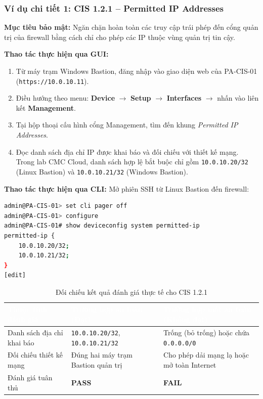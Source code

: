 \documentclass[12pt,a4paper]{article}
\renewcommand{\arraystretch}{1.3}
\begin{document}
\subsubsection{Ví dụ chi tiết 1: CIS 1.2.1 -- Permitted IP Addresses}
\noindent\textbf{Mục tiêu bảo mật:} Ngăn chặn hoàn toàn các truy cập trái phép đến cổng quản trị của firewall bằng cách chỉ cho phép các IP thuộc vùng quản trị tin cậy.

\noindent\textbf{Thao tác thực hiện qua GUI:}
\begin{enumerate}
    \item Từ máy trạm Windows Bastion, đăng nhập vào giao diện web của PA-CIS-01 (\texttt{https://10.0.10.11}).
    \item Điều hướng theo menu: \textbf{Device} $\rightarrow$ \textbf{Setup} $\rightarrow$ \textbf{Interfaces} $\rightarrow$ nhấn vào liên kết \textbf{Management}.
    \item Tại hộp thoại cấu hình cổng Management, tìm đến khung \textit{Permitted IP Addresses}.
    \item Đọc danh sách địa chỉ IP được khai báo và đối chiếu với thiết kế mạng. Trong lab CMC Cloud, danh sách hợp lệ bắt buộc chỉ gồm \texttt{10.0.10.20/32} (Linux Bastion) và \texttt{10.0.10.21/32} (Windows Bastion).
\end{enumerate}

\noindent\textbf{Thao tác thực hiện qua CLI:}
Mở phiên SSH từ Linux Bastion đến firewall:
\begin{lstlisting}[language=bash,caption={Truy vấn Permitted IP Addresses qua CLI}]
admin@PA-CIS-01> set cli pager off
admin@PA-CIS-01> configure
admin@PA-CIS-01# show deviceconfig system permitted-ip
permitted-ip {
    10.0.10.20/32;
    10.0.10.21/32;
}
[edit]
\end{lstlisting}

\begin{table}[H]
\centering\small
\caption{Đối chiếu kết quả đánh giá thực tế cho CIS 1.2.1}
\label{tab:cis-121-eval}
\renewcommand{\arraystretch}{1.45}
\begingroup
\setlength{\tabcolsep}{5pt}
\begin{tabular}{|>{\raggedright\arraybackslash}p{4.0cm}|>{\raggedright\arraybackslash}p{5.1cm}|>{\raggedright\arraybackslash}p{5.1cm}|}
\hline
\rowcolor{CISBlue}
\textcolor{white}{\textbf{Thuộc tính đánh giá}} & \textcolor{white}{\textbf{Trường hợp an toàn (Đạt)}} & \textcolor{white}{\textbf{Trường hợp mất an toàn (Không đạt)}} \\
\hline
Danh sách địa chỉ khai báo & \texttt{10.0.10.20/32}, \texttt{10.0.10.21/32} & Trống (bỏ trống) hoặc chứa \texttt{0.0.0.0/0} \\ \hline
Đối chiếu thiết kế mạng & Đúng hai máy trạm Bastion quản trị & Cho phép dải mạng lạ hoặc mở toàn Internet \\ \hline
Đánh giá tuân thủ & \textcolor{CISGreen}{\textbf{PASS}} & \textcolor{CISRed}{\textbf{FAIL}} \\ \hline
\end{tabular}
\endgroup
\end{table}
\end{document}
